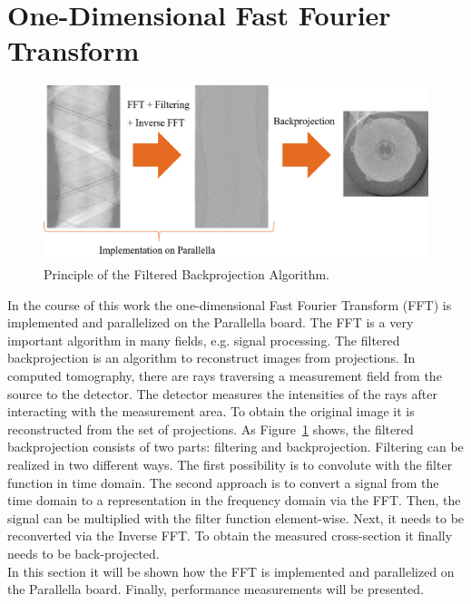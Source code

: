 \documentclass[american, hauptseminar, twoside]{zihpub}
\begin{document}
					\clearpage
	\section{One-Dimensional Fast Fourier Transform}
		\label{sec:implementation}
		\begin{figure}[b!]
			\begin{center}
				\includegraphics[width=\textwidth]{grafiken/fbp.png}
				\caption{Principle of the Filtered Backprojection Algorithm.}
				\label{fig:fbp}
			\end{center}
		\end{figure}
		In the course of this work the one-dimensional Fast Fourier Transform (FFT) is implemented and parallelized on the Parallella board. The FFT is a very important algorithm in many fields, e.g. signal processing. The filtered backprojection is an algorithm to reconstruct images from projections. In computed tomography, there are rays traversing a measurement field from the source to the detector. The detector measures the intensities of the rays after interacting with the measurement area. To obtain the original image it is reconstructed from the set of projections. As Figure~\ref{fig:fbp} shows, the filtered backprojection consists of two parts: filtering and backprojection. Filtering can be realized in two different ways. The first possibility is to convolute with the filter function in time domain. The second approach is to convert a signal from the time domain to a representation in the frequency domain via the FFT. Then, the signal can be multiplied with the filter function element-wise. Next, it needs to be reconverted via the Inverse FFT. To obtain the measured cross-section it finally needs to be back-projected. 
		\\
		In this section it will be shown how the FFT is implemented and parallelized on the Parallella board. Finally, performance measurements will be presented.
		
\end{document}
